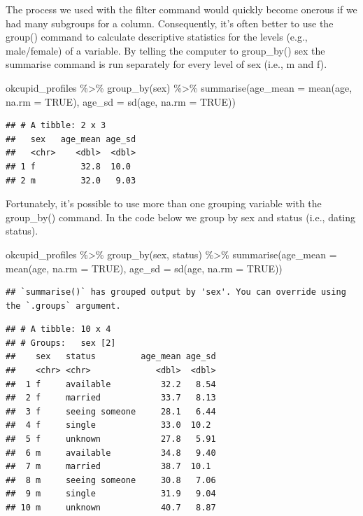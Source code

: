 \documentclass[
]{krantz}
\makeatletter
\newenvironment{Shaded}{\begin{snugshade}}{\end{snugshade}}
\newcommand{\AttributeTok}[1]{\textcolor[rgb]{0.61,0.61,0.61}{#1}}
\newcommand{\ConstantTok}[1]{\textcolor[rgb]{0,0,0}{#1}}
\newcommand{\FunctionTok}[1]{\textcolor[rgb]{0,0,0}{#1}}
\newcommand{\NormalTok}[1]{#1}
\newcommand{\SpecialCharTok}[1]{\textcolor[rgb]{0,0,0}{#1}}
\newenvironment{kframe}{%
\medskip{}
\setlength{\fboxsep}{.8em}
 \def\at@end@of@kframe{}%
 \ifinner\ifhmode%
  \def\at@end@of@kframe{\end{minipage}}%
  \begin{minipage}{\columnwidth}%
 \fi\fi%
 \def\FrameCommand##1{\hskip\@totalleftmargin \hskip-\fboxsep
 \colorbox{shadecolor}{##1}\hskip-\fboxsep
     \hskip-\linewidth \hskip-\@totalleftmargin \hskip\columnwidth}%
 \MakeFramed {\advance\hsize-\width
   \@totalleftmargin\z@ \linewidth\hsize
   \@setminipage}}%
 {\par\unskip\endMakeFramed%
 \at@end@of@kframe}
\renewenvironment{Shaded}{\begin{kframe}}{\end{kframe}}
\makeatother
\begin{document}
The process we used with the filter command would quickly become onerous if we had many subgroups for a column. Consequently, it's often better to use the group() command to calculate descriptive statistics for the levels (e.g., male/female) of a variable. By telling the computer to group\_by() sex the summarise command is run separately for every level of sex (i.e., m and f).

\begin{Shaded}
\begin{Highlighting}[]
\NormalTok{okcupid\_profiles }\SpecialCharTok{\%\textgreater{}\%}
  \FunctionTok{group\_by}\NormalTok{(sex) }\SpecialCharTok{\%\textgreater{}\%}
  \FunctionTok{summarise}\NormalTok{(}\AttributeTok{age\_mean =} \FunctionTok{mean}\NormalTok{(age, }\AttributeTok{na.rm =} \ConstantTok{TRUE}\NormalTok{),}
            \AttributeTok{age\_sd =} \FunctionTok{sd}\NormalTok{(age, }\AttributeTok{na.rm =} \ConstantTok{TRUE}\NormalTok{)) }
\end{Highlighting}
\end{Shaded}

\begin{verbatim}
## # A tibble: 2 x 3
##   sex   age_mean age_sd
##   <chr>    <dbl>  <dbl>
## 1 f         32.8  10.0 
## 2 m         32.0   9.03
\end{verbatim}

Fortunately, it's possible to use more than one grouping variable with the group\_by() command. In the code below we group by sex and status (i.e., dating status).

\begin{Shaded}
\begin{Highlighting}[]
\NormalTok{okcupid\_profiles }\SpecialCharTok{\%\textgreater{}\%}
  \FunctionTok{group\_by}\NormalTok{(sex, status) }\SpecialCharTok{\%\textgreater{}\%}
  \FunctionTok{summarise}\NormalTok{(}\AttributeTok{age\_mean =} \FunctionTok{mean}\NormalTok{(age, }\AttributeTok{na.rm =} \ConstantTok{TRUE}\NormalTok{),}
            \AttributeTok{age\_sd =} \FunctionTok{sd}\NormalTok{(age, }\AttributeTok{na.rm =} \ConstantTok{TRUE}\NormalTok{)) }
\end{Highlighting}
\end{Shaded}

\begin{verbatim}
## `summarise()` has grouped output by 'sex'. You can override using the `.groups` argument.
\end{verbatim}

\begin{verbatim}
## # A tibble: 10 x 4
## # Groups:   sex [2]
##    sex   status         age_mean age_sd
##    <chr> <chr>             <dbl>  <dbl>
##  1 f     available          32.2   8.54
##  2 f     married            33.7   8.13
##  3 f     seeing someone     28.1   6.44
##  4 f     single             33.0  10.2 
##  5 f     unknown            27.8   5.91
##  6 m     available          34.8   9.40
##  7 m     married            38.7  10.1 
##  8 m     seeing someone     30.8   7.06
##  9 m     single             31.9   9.04
## 10 m     unknown            40.7   8.87
\end{verbatim}
\end{document}

